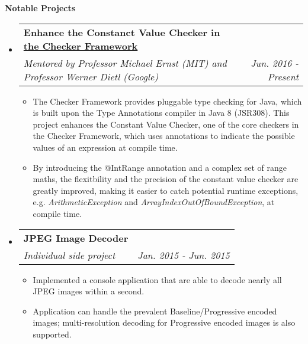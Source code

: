 \documentclass[letterpaper,10pt]{article}
\makeatletter
\newcommand{\resitem}[1]{\item #1 \vspace{-2pt}}
\newcommand{\resheading}[1]{{\large \colorbox{mygrey}{\begin{minipage}{\textwidth}{\textbf{#1 \vphantom{p\^{E}}}}\end{minipage}}}}
\newcommand{\ressubheading}[4]{
\begin{tabular*}{7.0in}{l@{\extracolsep{\fill}}r}
		\textbf{#1} & #2 \\
		\textit{#3} & \textit{#4} \\
\end{tabular*}\vspace{-6pt}}
\makeatother
\begin{document}
\resheading{Notable Projects}
\begin{itemize}
\itemsep0em
\item
	\ressubheading{Enhance the Constanct Value Checker in \href{https://github.com/typetools/checker-framework}{the Checker Framework}}{}{Mentored by Professor Michael Ernst (MIT) and Professor Werner Dietl (Google)}{Jun. 2016 - Present}
	\begin{itemize}
        \resitem{The Checker Framework provides pluggable type checking for Java, which is built upon the Type Annotations compiler in Java 8 (JSR308). This project enhances the Constant Value Checker, one of the core checkers in the Checker Framework, which uses annotations to indicate the possible values of an expression at compile time.}
        \resitem{By introducing the @IntRange annotation and a complex set of range maths, the flexitbility and the precision of the constant value checker are greatly improved, making it easier to catch potential runtime exceptions, e.g. \textit{ArithmeticException} and \textit{ArrayIndexOutOfBoundException}, at compile time.}
	\end{itemize}
\item
	\ressubheading{JPEG Image Decoder}{}{Individual side project}{Jan. 2015 - Jun. 2015}
	\begin{itemize}
		\resitem{Implemented a console application that are able to decode nearly all JPEG images within a second.}
        \resitem{Application can handle the prevalent Baseline/Progressive encoded images; multi-resolution decoding for Progressive encoded images is also supported.}
	\end{itemize}
	
\end{itemize}
\end{document}

